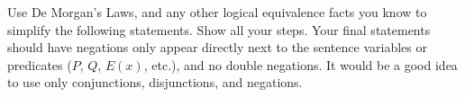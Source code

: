 \begin{questions}


\question Use De Morgan's Laws, and any other logical equivalence facts you know to simplify the following statements.  Show all your steps.  Your final statements should have negations only appear directly next to the sentence variables or predicates ($P$, $Q$, $E(x)$, etc.), and no double negations.  It would be a good idea to use only conjunctions, disjunctions, and negations.
\end{questions}
